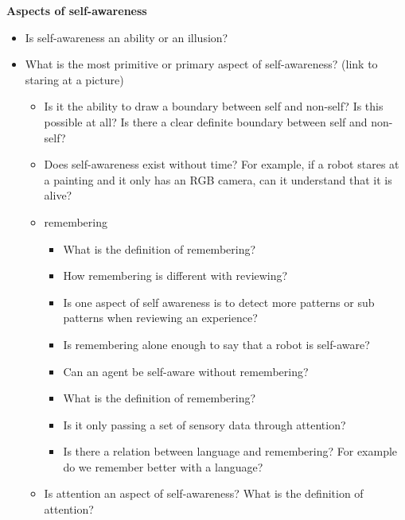 \documentclass{book}
\providecommand{\ProjectDeepHeading}[2]{%
    \par\medskip\noindent\textbf{#2}\par\smallskip
}
\begin{document}
\ProjectDeepHeading{1}{Aspects of self-awareness}
\begin{itemize}
    \item Is self-awareness an ability or an illusion?
\end{itemize}
\begin{itemize}
    \item What is the most primitive or primary aspect of self-awareness? (link to staring at a picture)
    \begin{itemize}
        \item Is it the ability to draw a boundary between self and non-self? Is this possible at all? Is there a clear definite boundary between self and non-self?
    \end{itemize}
    \begin{itemize}
        \item Does self-awareness exist without time? For example, if a robot stares at a painting and it only has an RGB camera, can it understand that it is alive?
        \item remembering
        \begin{itemize}
            \item What is the definition of remembering?
            \item How remembering is different with reviewing?
            \item Is one aspect of self awareness is to detect more patterns or sub patterns when reviewing an experience?
        \end{itemize}
        \begin{itemize}
            \item Is remembering alone enough to say that a robot is self-aware?
            \item Can an agent be self-aware without remembering?
            \item What is the definition of remembering?
            \item Is it only passing a set of sensory data through attention?
            \item Is there a relation between language and remembering? For example do we remember better with a language?
        \end{itemize}
        \item Is attention an aspect of self-awareness? What is the definition of attention?
    \end{itemize}
\end{itemize}
\end{document}
